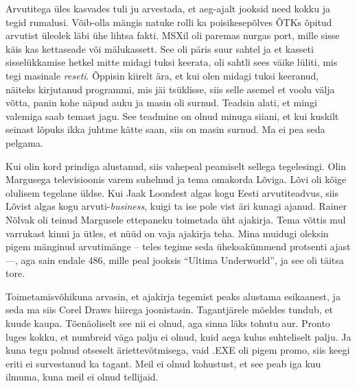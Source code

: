 Arvutitega üles kasvades tuli ju arvestada, et aeg-ajalt 
jooksid need kokku ja tegid rumalusi. Võib-olla mängis natuke 
rolli ka poisikesepõlves ÕTKs õpitud arvutist üleolek läbi ühe lihtsa fakti. 
MSXil oli paremas nurgas port, mille sisse käis kas 
kettaseade või mälukassett. See oli päris suur 
sahtel ja et kasseti sisselükkamise hetkel mitte midagi tuksi 
keerata, oli sahtli sees väike lüliti, mis tegi masinale \emph{reseti}. 
Õppisin kiirelt ära, et kui olen midagi tuksi keeranud, näiteks 
kirjutanud programmi, mis jäi tsüklisse, siis selle asemel et voolu välja 
võtta, panin kohe näpud auku ja masin oli surnud. Teadsin alati, et 
mingi valemiga saab temast jagu. See teadmine on olnud minuga siiani, et kui 
kuskilt seinast lõpuks ikka juhtme kätte saan, siis on masin surnud. Ma ei pea 
seda pelgama.


Kui olin kord prindiga alustanud, siis vahepeal peamiselt sellega tegelesingi. 
Olin 
Margusega televisioonis varem suhelnud ja tema omakorda 
Lõviga. Lõvi oli kõige olulisem 
tegelane üldse. Kui Jaak Loondest algas kogu Eesti 
arvutiteadvus, siis 
Lõvist algas kogu arvuti-\emph{business}, kuigi ta ise pole vist 
äri kunagi ajanud. 
Rainer Nõlvak oli teinud Margusele ettepaneku 
toimetada üht ajakirja. Tema võttis mul varrukast kinni ja ütles, 
et nüüd on vaja ajakirja teha. Mina muidugi oleksin pigem 
mänginud arvutimänge -- teles tegime seda üheksakümmend 
protsenti ajast ---, aga sain endale 486, mille peal jooksis \enquote{Ultima 
Underworld}, ja 
see oli täitsa tore. 

Toimetamisvõhikuna arvasin, et ajakirja tegemist peaks alustama 
esikaanest, ja seda ma siis Corel Draws hiirega 
joonistasin. Tagantjärele mõeldes tundub, et 
kuude kaupa. Tõenäoliselt see nii ei olnud, aga sinna läks tohutu aur. 
Pronto luges kokku, et numbreid väga palju ei olnud, kuid 
aega kulus 
suhteliselt palju. Ja kuna tegu polnud otseselt 
äriettevõtmisega, vaid .EXE oli pigem promo, siis keegi eriti ei 
survestanud ka tagant. Meil ei olnud kohustust, et see peab iga kuu ilmuma, 
kuna meil ei olnud 
tellijaid.


